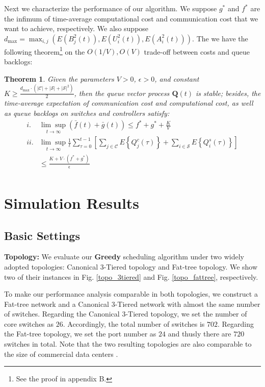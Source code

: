 \documentclass[10pt,journal,compsoc]{IEEEtran}
\newtheorem{theorem}{Theorem}
\begin{document}
Next we characterize the performance of our algorithm. We suppose $g^*$ and $f^*$ are the infimum of time-average computational cost and communication cost that we want to achieve, respectively. We also suppose $d_{\max}=\max_{i,j} (E(B_j^2(t)), E(U_i^2(t)), E(A_i^2(t)))$. The we have the following theorem\footnote{See the proof in appendix B.} on the $O(1/V),O(V)$ trade-off between costs and queue backlogs:
\begin{theorem}
	Given the parameters $V>0$, $\epsilon>0$, and constant $\displaystyle K \ge \frac{d_{\max} \cdot (|\mathcal{C}| + |\mathcal{S}| + |\mathcal{S}|^2)}{2}$, then the queue vector process $\mathbf{Q}(t)$ is stable; besides, the time-average expectation of communication cost and computational cost, as well as queue backlogs on switches and controllers satisfy:
	\begin{equation}\label{th1}
		\begin{array}{cl}
			i. & \displaystyle \underset{t \to \infty}{\lim \sup} \left( \bar{f}(t) + \bar{g}(t) \right) \le f^* + g^* + \frac{K}{V} \\
			ii. & \displaystyle \underset{t \to \infty}{\lim \sup} \frac{1}{t} \sum_{\tau=0}^{t-1} \left[ \sum_{j \in \mathcal{C}} E\left\{ Q^c_j(\tau) \right\} + \sum_{i \in \mathcal{S}} E\left\{ Q^s_i(\tau) \right\} \right]
			\\
			& \displaystyle \le \frac{K + V \cdot (f^* + g^*) }{\epsilon} \\
	\end{array}
	\end{equation}
\end{theorem}

\section{Simulation Results}

\subsection{Basic Settings}

\textbf{Topology:} We evaluate our {\bf Greedy} scheduling algorithm under two widely adopted topologies: Canonical 3-Tiered topology and Fat-tree\cite{al2008scalable} topology.  We show two of their instances in Fig. \ref{topo_3tiered} and Fig. \ref{topo_fattree}, respectively. 

To make our performance analysis comparable in both topologies, we construct a Fat-tree network and a Canonical 3-Tiered network with almost the same number of switches. Regarding the Canonical 3-Tiered topology, 
we set the number of core switches as $26$. Accordingly, the total number of switches is $702$. Regarding the Fat-tree topology, we set the port number as $24$ and thusly there are $720$ switches in total. Note that the two resulting topologies are also comparable to the size of commercial data centers \cite{benson2010network}. 
\end{document}
